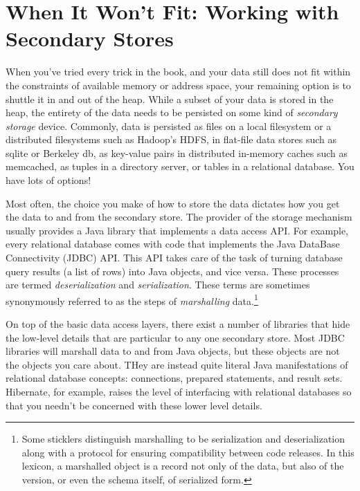 \chapter{When It Won't Fit: Working with Secondary Stores}

When you've tried every trick in the book, and your data still does not fit
within the constraints of available memory or address space, your remaining
option is to shuttle it in and out of the heap. While a subset of your data is
stored in the heap, the entirety of the data needs to be persisted on some kind
of \emph{secondary storage} device. Commonly, data is persisted as files on a
local filesystem or a distributed filesystems such as Hadoop's HDFS, in
flat-file data stores such as sqlite or Berkeley db, as key-value pairs in
distributed in-memory caches such as memcached, as tuples in a directory server,
or tables in a relational database. You have lots of options!

Most often, the choice you make of how to store the data dictates how you get
the data to and from the secondary store. The provider of the storage mechanism
usually provides a Java library that implements a data access API. For example,
every relational database comes with code that implements the Java DataBase
Connectivity (JDBC) API. This API takes care of the task of turning database
query results (a list of rows) into Java objects, and vice versa. These
processes are termed \emph{deserialization} and
\emph{serialization}. These terms are sometimes
synonymously referred to as the steps of \emph{marshalling} data.\footnote{Some
sticklers distinguish marshalling to be serialization and deserialization along
with a protocol for ensuring compatibility between code releases. In this
lexicon, a marshalled object is a record not only of the data, but also of the
version, or even the schema itself, of serialized form.}

On top of the basic data access layers, there exist a number of libraries that
hide the low-level details that are particular to any one secondary store. Most
JDBC libraries will marshall data to and from Java objects, but these objects
are not the objects you care about. THey are instead quite literal Java
manifestations of relational database concepts: connections, prepared
statements, and result sets. Hibernate, for example, raises the level of
interfacing with relational databases so that you needn't be concerned with
these lower level details.



